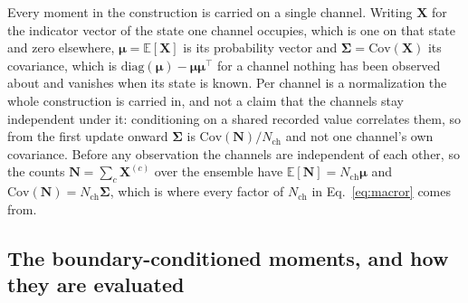 \begin{appendixbox}
Every moment in the construction is carried on a single channel. Writing $\mathbf{X}$ for the
indicator vector of the state one channel occupies, which is one on that state and zero
elsewhere, $\bm{\mu}=\mathbb{E}[\mathbf{X}]$ is its probability vector and
$\bm{\Sigma}=\mathrm{Cov}(\mathbf{X})$ its covariance, which is
$\mathrm{diag}(\bm{\mu})-\bm{\mu}\bm{\mu}^\top$ for a channel nothing has been observed about
and vanishes when its state is known. Per channel is a normalization the whole construction is
carried in, and not a claim that the channels stay independent under it: conditioning on a shared
recorded value correlates them, so from the first update onward $\bm{\Sigma}$ is
$\mathrm{Cov}(\mathbf{N})/N_{\mathrm{ch}}$ and not one channel's own covariance. Before any
observation the channels are independent of each other, so the counts
$\mathbf{N}=\sum_c \mathbf{X}^{(c)}$ over the ensemble have
$\mathbb{E}[\mathbf{N}]=N_{\mathrm{ch}}\bm{\mu}$ and
$\mathrm{Cov}(\mathbf{N})=N_{\mathrm{ch}}\bm{\Sigma}$, which is where every factor of
$N_{\mathrm{ch}}$ in Eq.~\ref{eq:macror} comes from.



\subsection*{The boundary-conditioned moments, and how they are evaluated}


\end{appendixbox}
